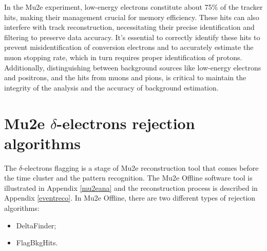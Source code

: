 In the Mu2e experiment, low-energy electrons constitute about 75\% of the tracker hits, 
making their management crucial for memory efficiency. These hits can also interfere with 
track reconstruction, necessitating their precise identification and filtering to preserve 
data accuracy. It's essential to correctly identify these hits to prevent misidentification 
of conversion electrons and to accurately estimate the muon stopping rate, which in turn 
requires proper identification of protons. Additionally, distinguishing between background 
sources like low-energy electrons and positrons, and the hits from muons and pions, is 
critical to maintain the integrity of the analysis and the accuracy of background estimation.

\section{Mu2e $\delta$-electrons rejection algorithms}
The $\delta$-electrons flagging is a stage of Mu2e reconstruction tool that comes 
before the time cluster and the pattern recognition.
The Mu2e Offline software tool is illustrated in Appendix \ref{mu2eana} and 
the reconstruction process is described in Appendix \ref{eventreco}.
In Mu2e Offline, there are two different types of rejection algorithms:
\begin{itemize}
    \item DeltaFinder;
    \item FlagBkgHits.
\end{itemize}
